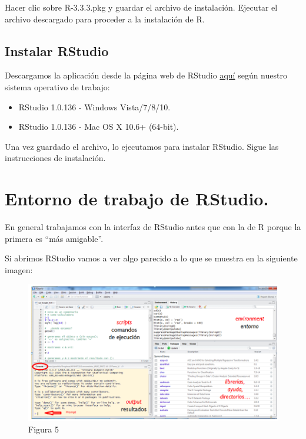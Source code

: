 \documentclass[
]{book}
\begin{document}
Hacer clic sobre R-3.3.3.pkg y guardar el archivo de instalación. Ejecutar el archivo descargado para proceder a la instalación de R.

\hypertarget{instalar-rstudio}{%
\subsection{Instalar RStudio}\label{instalar-rstudio}}

Descargamos la aplicación desde la página web de RStudio \href{https://posit.co/download/rstudio-desktop/}{aquí} según nuestro sistema operativo de trabajo:

\begin{itemize}
\item
  RStudio 1.0.136 - Windows Vista/7/8/10.
\item
  RStudio 1.0.136 - Mac OS X 10.6+ (64-bit).
\end{itemize}

Una vez guardado el archivo, lo ejecutamos para instalar RStudio. Sigue las instrucciones de instalación.

\hypertarget{entorno-de-trabajo-de-rstudio.}{%
\section{Entorno de trabajo de RStudio.}\label{entorno-de-trabajo-de-rstudio.}}

En general trabajamos con la interfaz de RStudio antes que con la de R porque la primera es ``más amigable''.

Si abrimos RStudio vamos a ver algo parecido a lo que se muestra en la siguiente imagen:

\begin{figure}
\centering
\includegraphics{imagenes/05.png}
\caption{Figura 5}
\end{figure}
\end{document}
